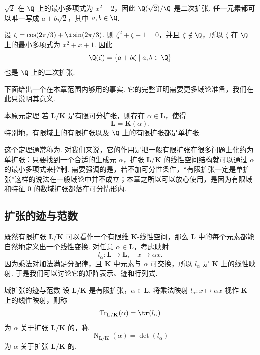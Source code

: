 \begin{example}{}{}
    $\sqrt{2}$ 在 $\Q$ 上的最小多项式为 $x^2-2$，因此 $\Q(\sqrt{2})/\Q$ 是二次扩张. 任一元素都可以唯一写成 $a+b\sqrt{2}$，其中 $a,b\in\Q$.
\end{example}

\begin{example}{}{}
    设 $\zeta=\cos(2\pi/3)+\i\sin(2\pi/3)$. 则 $\zeta^2+\zeta+1=0$，并且 $\zeta\notin\Q$，所以 $\zeta$ 在 $\Q$ 上的最小多项式为 $x^2+x+1$. 因此
    \[
        \Q(\zeta)=\{a+b\zeta\mid a,b\in\Q\}
    \]
    也是 $\Q$ 上的二次扩张.
\end{example}

下面给出一个在本章范围内够用的事实. 它的完整证明需要更多域论准备，我们在此只说明其意义.

\begin{theorem}{本原元定理}{}
    若 $\mathbf{L}/\mathbf{K}$ 是有限可分扩张，则存在 $\alpha\in\mathbf{L}$，使得
    \[
        \mathbf{L}=\mathbf{K}(\alpha).
    \]
    特别地，有限域上的有限扩张以及 $\Q$ 上的有限扩张都是单扩张.
\end{theorem}

这个定理通常称为. 对我们来说，它的作用是把一般有限扩张在很多问题上化约为单扩张：只要找到一个合适的生成元 $\alpha$，扩张 $\mathbf{L}/\mathbf{K}$ 的线性空间结构就可以通过 $\alpha$ 的最小多项式来控制. 需要强调的是，若不加可分性条件，``有限扩张一定是单扩张''这样的说法在一般域论中并不成立；本章之所以可以放心使用，是因为有限域和特征 $0$ 的数域扩张都落在可分情形内.

\subsection{扩张的迹与范数}

既然有限扩张 $\mathbf{L}/\mathbf{K}$ 可以看作一个有限维 $\mathbf{K}$-线性空间，那么 $\mathbf{L}$ 中的每个元素都能自然地定义出一个线性变换. 对任意 $\alpha\in\mathbf{L}$，考虑映射
\[
    l_\alpha\colon \mathbf{L}\to\mathbf{L},\quad x\mapsto \alpha x.
\]
因为乘法对加法满足分配律，且 $\mathbf{K}$ 中元素与 $\alpha$ 可交换，所以 $l_\alpha$ 是 $\mathbf{K}$ 上的线性映射. 于是我们可以讨论它的矩阵表示、迹和行列式.

\begin{definition}{域扩张的迹与范数}{}
    设 $\mathbf{L}/\mathbf{K}$ 是有限扩张，$\alpha\in\mathbf{L}$. 将乘法映射 $l_\alpha\colon x\mapsto\alpha x$ 视作 $\mathbf{K}$ 上的线性映射，则称
    \[
        \operatorname{Tr}_{\mathbf{L}/\mathbf{K}}(\alpha)=\tr(l_\alpha)
    \]
    为 $\alpha$ 关于扩张 $\mathbf{L}/\mathbf{K}$ 的，称
    \[
        \operatorname{N}_{\mathbf{L}/\mathbf{K}}(\alpha)=\det(l_\alpha)
    \]
    为 $\alpha$ 关于扩张 $\mathbf{L}/\mathbf{K}$ 的.
\end{definition}

